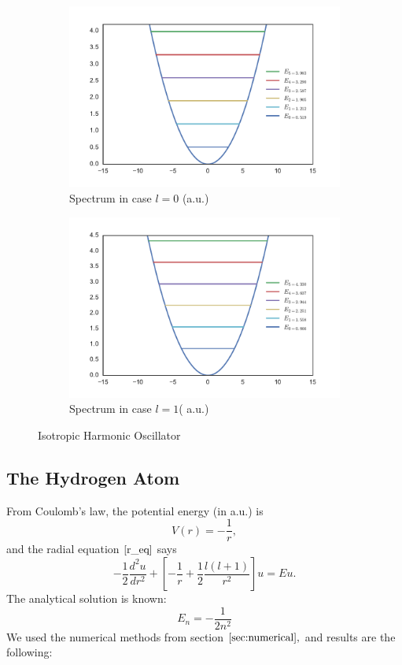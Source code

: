 \documentclass[a4paper, 12pt]{article}
\begin{document}
\begin{figure}[h!]
\centering
\begin{subfigure}{.5\textwidth}
  \centering
  \includegraphics[width=1.0\linewidth]{harm_osc.pdf}
  \caption{Spectrum in case $l=0$ (a.u.)}
  \label{fig1:harm_osc}
\end{subfigure}%
\begin{subfigure}{.5\textwidth}
  \centering
  \includegraphics[width=1.0\linewidth]{harm_osc1.pdf}
  \caption{Spectrum in case $l=1$( a.u.)}
  \label{fig:harm_osc1}
\end{subfigure}
\caption{Isotropic Harmonic Oscillator}
\label{fig:Harm_osc}
\end{figure}


\subsection{The Hydrogen Atom}
From Coulomb's law, the potential energy (in a.u.) is 
$$V(r) = -\frac{1}{r},$$
and the radial equation $\eqref{r_eq}$  says
$$-\frac{1}{2}\frac{d^2 u}{dr^2}+[-\frac{1}{r}+\frac{1}{2}\frac{l(l+1)}{r^2}]u = Eu.$$
The analytical solution is known:
\begin{equation}\label{h2_sol}
   E_n = -\frac{1}{2 n^2}
\end{equation}
We used the numerical methods from section $\ref{sec:numerical},$ and results are the following:
\end{document}
